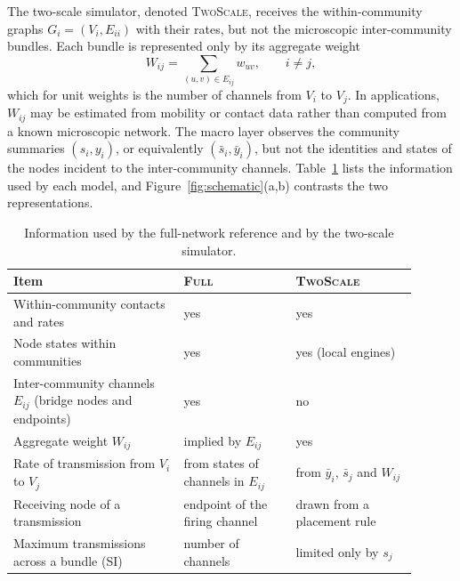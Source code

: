 \documentclass[a4paper,fleqn]{cas-sc}
\newcommand{\ibar}{\bar{y}}
\newcommand{\sbar}{\bar{s}}
\newcommand{\Full}{\textup{\textsc{Full}}}
\newcommand{\TS}{\textup{\textsc{TwoScale}}}
\begin{document}
The two-scale simulator, denoted \TS{}, receives the within-community graphs $G_i=(V_i,E_{ii})$ with their rates, but not the microscopic inter-community bundles. Each bundle is represented only by its aggregate weight
\begin{equation}
\label{eq:weight}
W_{ij}=\sum_{(u,v)\in E_{ij}}w_{uv},\qquad i\neq j,
\end{equation}
which for unit weights is the number of channels from $V_i$ to $V_j$. In applications, $W_{ij}$ may be estimated from mobility or contact data rather than computed from a known microscopic network. The macro layer observes the community summaries $(s_i,y_i)$, or equivalently $(\sbar_i,\ibar_i)$, but not the identities and states of the nodes incident to the inter-community channels. Table~\ref{tab:information} lists the information used by each model, and Figure~\ref{fig:schematic}(a,b) contrasts the two representations.

\clearpage
\begin{table}[H]
\centering
\caption{Information used by the full-network reference and by the two-scale simulator.}
\label{tab:information}
\small
\begin{tabular}{>{\raggedright\arraybackslash}p{0.38\linewidth}>{\raggedright\arraybackslash}p{0.25\linewidth}>{\raggedright\arraybackslash}p{0.27\linewidth}}
\toprule
Item & \Full{} & \TS{}\\
\midrule
Within-community contacts and rates & yes & yes\\
Node states within communities & yes & yes (local engines)\\
Inter-community channels $E_{ij}$ (bridge nodes and endpoints) & yes & no\\
Aggregate weight $W_{ij}$ & implied by $E_{ij}$ & yes\\
Rate of transmission from $V_i$ to $V_j$ & from states of channels in $E_{ij}$ & from $\ibar_i$, $\sbar_j$ and $W_{ij}$\\
Receiving node of a transmission & endpoint of the firing channel & drawn from a placement rule\\
Maximum transmissions across a bundle (SI) & number of channels & limited only by $s_j$\\
\bottomrule
\end{tabular}
\end{table}
\end{document}

